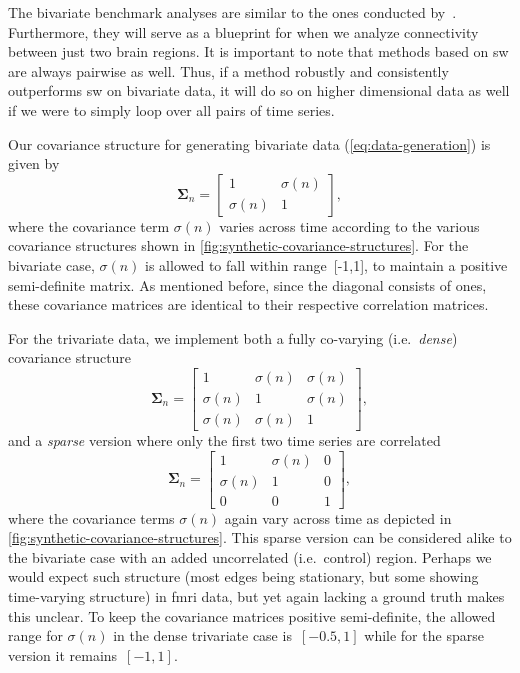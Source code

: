 The bivariate benchmark analyses are similar to the ones conducted by~\textcite{Lindquist2014}.
Furthermore, they will serve as a blueprint for when we analyze connectivity between just two brain regions.
It is important to note that methods based on \gls{sw} are always pairwise as well.
Thus, if a method robustly and consistently outperforms \gls{sw} on bivariate data, it will do so on higher dimensional data as well if we were to simply loop over all pairs of time series.

Our covariance structure for generating bivariate data (\cref{eq:data-generation}) is given by
\begin{equation}
  \mathbf{\Sigma}_n = \begin{bmatrix}
    1 & \sigma(n) \\
    \sigma(n) & 1
  \end{bmatrix},
\end{equation}
where the covariance term $\sigma(n)$ varies across time according to the various covariance structures shown in \cref{fig:synthetic-covariance-structures}.
For the bivariate case, $\sigma(n)$ is allowed to fall within range~[-1,1], to maintain a positive semi-definite matrix.
As mentioned before, since the diagonal consists of ones, these covariance matrices are identical to their respective correlation matrices.

For the trivariate data, we implement both a fully co-varying (i.e.~\emph{dense}) covariance structure
\begin{equation}
  \mathbf{\Sigma}_n = \begin{bmatrix}
    1 & \sigma(n) & \sigma(n) \\
    \sigma(n) & 1 & \sigma(n) \\
    \sigma(n) & \sigma(n) & 1
  \end{bmatrix},
\end{equation}
and a \emph{sparse} version where only the first two time series are correlated
\begin{equation}
  \mathbf{\Sigma}_n = \begin{bmatrix}
    1 & \sigma(n) & 0 \\
    \sigma(n) & 1 & 0 \\
    0 & 0 & 1
  \end{bmatrix},
\end{equation}
where the covariance terms $\sigma(n)$ again vary across time as depicted in \cref{fig:synthetic-covariance-structures}.
This sparse version can be considered alike to the bivariate case with an added uncorrelated (i.e.~control) region.
Perhaps we would expect such structure (most edges being stationary, but some showing time-varying structure) in \gls{fmri} data, but yet again lacking a ground truth makes this unclear.
To keep the covariance matrices positive semi-definite, the allowed range for $\sigma(n)$ in the dense trivariate case is~$[-0.5,1]$ while for the sparse version it remains~$[-1,1]$.

